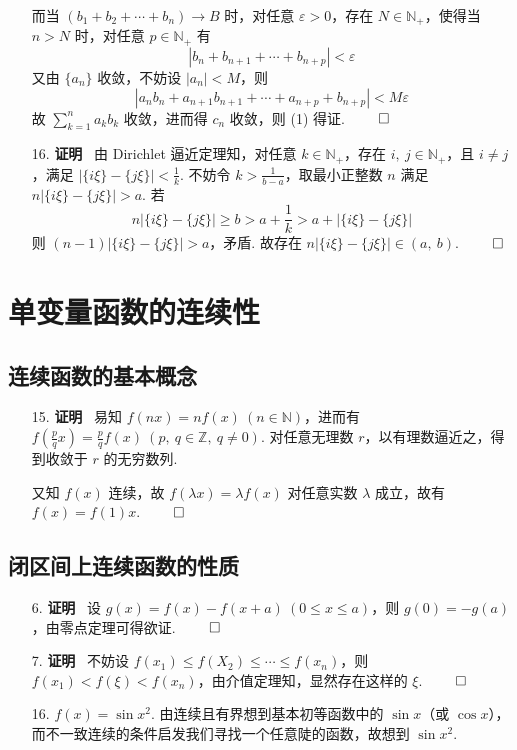 \documentclass[11pt,oneside,fontset=fandol]{ctexbook} %
\begin{document}
\begin{enumerate}
    而当 $(b_1 + b_2 + \cdots + b_n) \to B$ 时，对任意 $\varepsilon > 0$，存在 $N \in \mathbb N_+$，使得当 $n > N$ 时，对任意 $p \in \mathbb N_+$ 有
    \[
        |b_n + b_{n+1} + \cdots + b_{n+p}| < \varepsilon
    \]
    又由 $\{ a_n \}$ 收敛，不妨设 $|a_n| < M$，则
    \[
        |a_n b_n + a_{n+1} b_{n+1} + \cdots + a_{n+p} + b_{n+p}| < M \varepsilon
    \]
    故 $\sum_{k=1}^n a_k b_k$ 收敛，进而得 $c_n$ 收敛，则 (1) 得证.
    $\hfill\qed$
    \item[16.]
    \textbf{证明} \ 由 Dirichlet 逼近定理知，对任意 $k \in \mathbb N_+$，存在 $i,\ j \in \mathbb N_+$，且 $i \neq j$，满足 $|\{ i\xi \}-\{ j\xi \}|<\frac 1 k$. 不妨令 $k>\frac 1 {b-a}$，取最小正整数 $n$ 满足 $n|\{ i\xi \}-\{ j\xi \}|>a$. 若
    \[
        n|\{ i\xi \}-\{ j\xi \}| \geqslant b > a + \frac 1 k > a + |\{ i\xi \}-\{ j\xi \}|
    \]
    则 $(n-1)|\{ i\xi \}-\{ j\xi \}|>a$，矛盾. 故存在 $n|\{ i\xi \}-\{ j\xi \}| \in (a,\ b)$.
    $\hfill\qed$
\end{enumerate}

\newpage

\chapter{单变量函数的连续性}

\section{连续函数的基本概念}

\begin{enumerate}
    \item[15.]
    \textbf{证明} \ 易知 $f(nx) = nf(x) \ (n \in \mathbb N)$，进而有 $f\left(\frac p q x\right) = \frac p q f(x) \ (p,\ q \in \mathbb Z,\ q \neq 0)$. 对任意无理数 $r$，以有理数逼近之，得到收敛于 $r$ 的无穷数列.
    
    又知 $f(x)$ 连续，故 $f(\lambda x) = \lambda f(x)$ 对任意实数 $\lambda$ 成立，故有 $f(x) = f(1) x$.
    $\hfill\qed$
\end{enumerate}

\section{闭区间上连续函数的性质}

\begin{enumerate}
    \item[6.]
    \textbf{证明} \ 设 $g(x) = f(x) - f(x+a) \ (0 \leqslant x \leqslant a)$，则 $g(0) = -g(a)$，由零点定理可得欲证.
    $\hfill\qed$
    \item[7.]
    \textbf{证明} \ 不妨设 $f(x_1) \leqslant f(X_2) \leqslant \cdots \leqslant f(x_n)$，则 $f(x_1) < f(\xi) < f(x_n)$，由介值定理知，显然存在这样的 $\xi$.
    $\hfill\qed$
    \item[16.]
    $f(x) = \sin x^2$. 由连续且有界想到基本初等函数中的 $\sin x$（或 $\cos x$），而不一致连续的条件启发我们寻找一个任意陡的函数，故想到 $\sin x^2$.
\end{enumerate}
\end{document}
